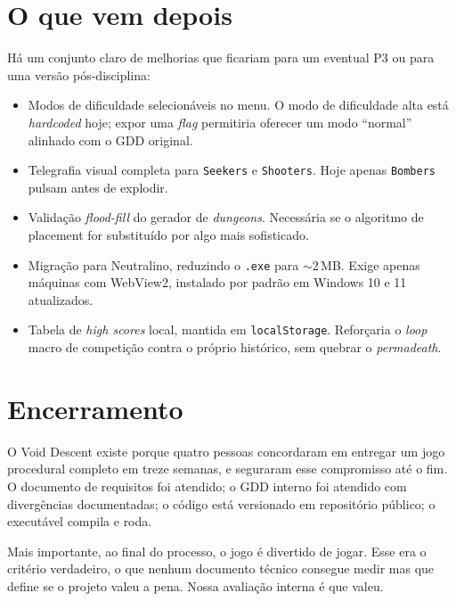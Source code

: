\section{O que vem depois}

Há um conjunto claro de melhorias que ficariam para um eventual P3 ou para uma versão
pós-disciplina:

\begin{itemize}
  \item Modos de dificuldade selecionáveis no menu. O modo de dificuldade alta
    está \emph{hardcoded} hoje; expor uma \emph{flag} permitiria oferecer um modo
    ``normal'' alinhado com o GDD original.
  \item Telegrafia visual completa para \texttt{Seekers} e \texttt{Shooters}. Hoje
    apenas \texttt{Bombers} pulsam antes de explodir.
  \item Validação \emph{flood-fill} do gerador de \emph{dungeons}. Necessária se o
    algoritmo de placement for substituído por algo mais sofisticado.
  \item Migração para Neutralino, reduzindo o \texttt{.exe} para $\sim$2\,MB. Exige
    apenas máquinas com WebView2, instalado por padrão em Windows 10 e 11
    atualizados.
  \item Tabela de \emph{high scores} local, mantida em \texttt{localStorage}.
    Reforçaria o \emph{loop} macro de competição contra o próprio histórico, sem
    quebrar o \emph{permadeath}.
\end{itemize}

\section{Encerramento}

O Void Descent existe porque quatro pessoas concordaram em entregar um jogo procedural
completo em treze semanas, e seguraram esse compromisso até o fim. O documento de
requisitos foi atendido; o GDD interno foi atendido com divergências documentadas; o
código está versionado em repositório público; o executável compila e roda.

Mais importante, ao final do processo, o jogo é divertido de jogar. Esse era o
critério verdadeiro, o que nenhum documento técnico consegue medir mas que define se
o projeto valeu a pena. Nossa avaliação interna é que valeu.
